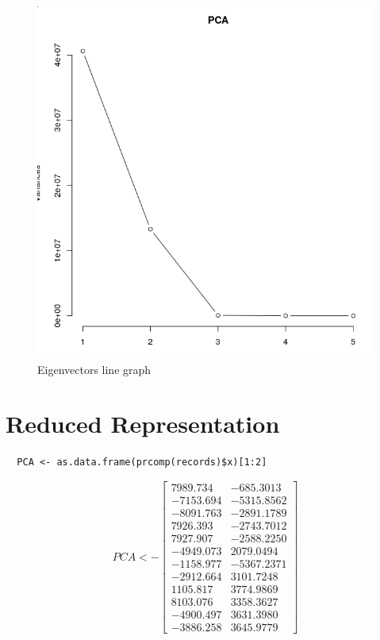 \documentclass{report}
\begin{document}
\begin{figure}[H]
	\includegraphics[width=\linewidth]{eigenvectors graph.png}
	 \caption{Eigenvectors line graph}
	\label{fig:eigenvectorslinegraph}
\end{figure}

\section{Reduced Representation}

\begin{verbatim}	
  PCA <- as.data.frame(prcomp(records)$x)[1:2]
\end{verbatim}

\[
  PCA <- 
  \begin{bmatrix}
    7989.734 & -685.3013 \\
    -7153.694 & -5315.8562 \\
    -8091.763 & -2891.1789 \\
    7926.393 & -2743.7012 \\
    7927.907 & -2588.2250 \\
    -4949.073 & 2079.0494 \\
    -1158.977 & -5367.2371 \\
    -2912.664 & 3101.7248 \\
    1105.817 & 3774.9869 \\
    8103.076 & 3358.3627 \\
    -4900.497 & 3631.3980 \\
    -3886.258 & 3645.9779
  \end{bmatrix}
\]
\end{document}
